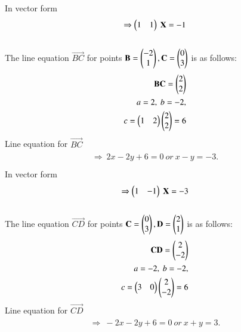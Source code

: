 \documentclass[journal,12pt,twocolumn]{IEEEtran}
\begin{document}
In vector form
\begin{align}
\begin{split}
\Rightarrow \begin{pmatrix}1&1\end{pmatrix}\ \mathbf{X}=-1\\
\end{split}
\end{align}
\\
The line equation $\vec{BC}$ for points $\mathbf{B} = \begin{pmatrix}-2\\1\end{pmatrix},\mathbf{C}=\begin{pmatrix}0\\3\end{pmatrix}$ is as follows:
\\
\begin{align}
\begin{split}
\mathbf{BC} = \begin{pmatrix}2\\2\end{pmatrix}\\
a=2,\ b=-2,\\
c=\begin{pmatrix}1 & 2\end{pmatrix} \begin{pmatrix}2\\2\end{pmatrix}=6\\
\end{split}
\end{align}
Line equation for $\vec{BC}$
\begin{align}
\begin{split}
\Rightarrow\ 2x-2y+6=0 \ or \ x-y=-3. \\
\end{split}
\end{align}
In vector form
\begin{align}
\begin{split}
\Rightarrow \begin{pmatrix}1&-1\end{pmatrix}\ \mathbf{X}=-3
\end{split}
\end{align}
\\
The line equation $\vec{CD}$ for points $\mathbf{C}=\begin{pmatrix}0\\3\end{pmatrix},\mathbf{D} = \begin{pmatrix}2\\1\end{pmatrix}$ is as follows:
\\
\begin{align}
\begin{split}
\mathbf{CD} = \begin{pmatrix}2\\-2\end{pmatrix}\\
a=-2,\ b=-2,\\
c=\begin{pmatrix}3 & 0\end{pmatrix} \begin{pmatrix}2\\-2\end{pmatrix}=6\\
\end{split}
\end{align}
Line equation for $\vec{CD}$
\begin{align}
\begin{split}
 \Rightarrow\ -2x-2y+6=0 \ or \ x+y=3. \\
\end{split}
\end{align}
\end{document}
